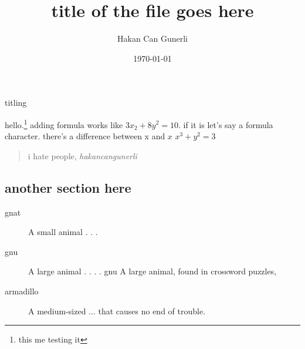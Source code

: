 \documentclass[14pt]{book}
\title{title of the file goes here}
\author{Hakan Can Gunerli}
\date{  \today}
\begin{document}
   \maketitle titling



hello.\footnote{this me testing it}
adding formula works like \(3x_{2}+8y^{2}=10\). if it is let's say a formula character. there's a difference between x and $x$
\begin{math}
x^3 + y^2 = 3 %
\end{math}

\begin{quote}
    i hate people, \emph{hakancangunerli} 
\end{quote}

\subsection{another section here}

\begin{description}
 \item[gnat] A small animal . . . 
 \item [gnu] A large animal . . . . gnu A large animal, found in crossword puzzles,
 \item [armadillo] A medium-sized ... that causes no end of trouble. 
 \end{description}

\end{document}
